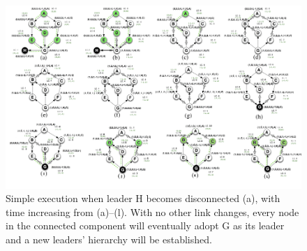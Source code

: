 \newpage
\begin{landscape}
\begin{figure}
	\centering
	\includegraphics[width=1\linewidth]{test_1}
	\caption{Simple execution when leader H becomes disconnected (a), with time increasing from (a)–(l). With no other link changes, every node in the connected component will eventually adopt G as its leader and a new leaders' hierarchy will be established.}
	\label{fig:test1}
\end{figure}

\end{landscape}